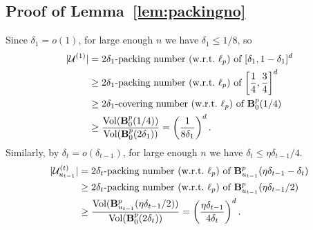 
\subsection{Proof of Lemma~\ref{lem:packingno}}
\label{sec:proof-packingno}

Since $\delta_1 = o(1)$, for large enough $n$ we have $\delta_1 \leq 1/8$, so
\begin{align*}
| \mathcal{U}^{(1)} | &= \text{$2\delta_1$-packing number (w.r.t.\ $\ell_p$) of $[\delta_1, 1-\delta_1]^d$} \\
&\geq \text{$2\delta_1$-packing number (w.r.t.\ $\ell_p$) of $\left [\frac{1}{4}, \frac{3}{4}\right ]^d$}\\
&\geq \text{$2\delta_1$-covering number (w.r.t.\ $\ell_p$) of $\mathbf{B}^p_{0}({1/4})$}\\
&\geq \frac{\text{Vol}(\mathbf{B}^p_{0}({1/4}))}{\text{Vol}(\mathbf{B}^p_{0}({2\delta_1}))} = \left(\frac{1}{8\delta_1} \right)^d.
\end{align*}
Similarly, by $\delta_t = o(\delta_{t-1})$, for large enough $n$ we have $\delta_t \leq \eta \delta_{t-1}/4$.
\begin{align*}
| \mathcal{U}^{({t})}_{u_{t-1}} | &= \text{$2\delta_t$-packing number (w.r.t.\ $\ell_p$) of $\mathbf{B}^p_{u_{t-1}}({\eta\delta_{t-1}-\delta_t})$} \\
&\geq \text{$2\delta_t$-packing number (w.r.t.\ $\ell_p$) of $\mathbf{B}^p_{u_{t-1}}({\eta\delta_{t-1}/2})$} \\
&\geq \frac{\text{Vol}(\mathbf{B}^p_{u_{t-1}}({\eta\delta_{t-1}/2}))}{\text{Vol}(\mathbf{B}^p_{0}({2\delta_t}))} = \left(\frac{\eta \delta_{t-1}}{4\delta_t} \right)^d.
\end{align*}

